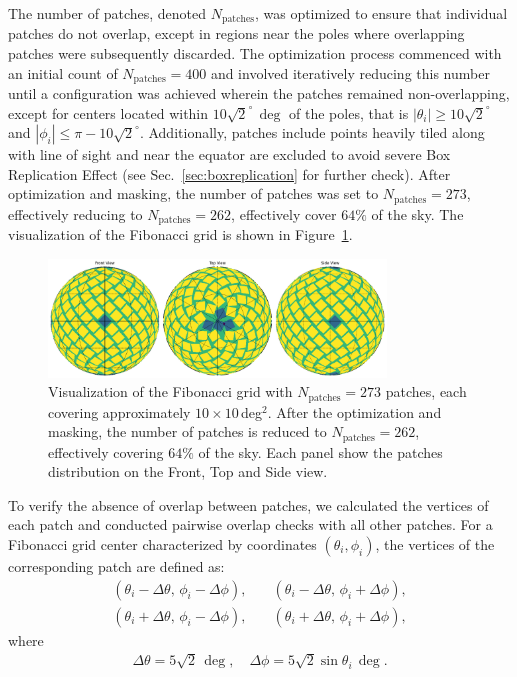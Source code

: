 The number of patches, denoted \( N_{\text{patches}} \), was optimized to ensure that individual patches do not overlap, except in regions near the poles where overlapping patches were subsequently discarded. The optimization process commenced with an initial count of \( N_{\text{patches}} = 400 \) and involved iteratively reducing this number until a configuration was achieved wherein the patches remained non-overlapping, except for centers located within \( 10\sqrt{2}^\circ \, \mathrm{\deg}\) of the poles, that is $|\theta_i| \geq 10\sqrt{2}^\circ$ and $|\phi_i| \leq \pi - 10\sqrt{2}^\circ$. Additionally, patches include points heavily tiled along with line of sight and near the equator are excluded to avoid severe Box Replication Effect (see Sec.~\ref{sec:boxreplication} for further check).
After optimization and masking, the number of patches was set to $N_{\text{patches}} = 273$, effectively reducing to $N_{\text{patches}} = 262$, effectively cover $64 \%$ of the sky. The visualization of the Fibonacci grid is shown in Figure~\ref{fig:fibonacci}.
\begin{figure}[ht]
    \centering
    \includegraphics[width=0.8\textwidth]{figures/fibonacci_grid.png}
    \caption{Visualization of the Fibonacci grid with $N_{\text{patches}} = 273$ patches, each covering approximately $10 \times 10$\,deg$^2$. 
    After the optimization and masking, the number of patches is reduced to $N_{\text{patches}} = 262$, effectively covering $64 \%$ of the sky.
    Each panel show the patches distribution on the Front, Top and Side view.}\label{fig:fibonacci}
\end{figure}

To verify the absence of overlap between patches, we calculated the vertices of each patch and conducted pairwise overlap checks with all other patches. For a Fibonacci grid center characterized by coordinates \( (\theta_i, \phi_i) \), the vertices of the corresponding patch are defined as:
\begin{align}
    \left( \theta_i - \Delta \theta,\, \phi_i - \Delta \phi \right), \quad &\left( \theta_i - \Delta \theta,\, \phi_i + \Delta \phi \right), \nonumber \\
    \left( \theta_i + \Delta \theta,\, \phi_i - \Delta \phi \right), \quad &\left( \theta_i + \Delta \theta,\, \phi_i + \Delta \phi \right),
\end{align}
where
\begin{align}
    \Delta \theta = 5\sqrt{2}\, \mathrm{\deg}, \quad \Delta \phi = 5\sqrt{2}\sin \theta_i \, \mathrm{\deg}.
\end{align}

